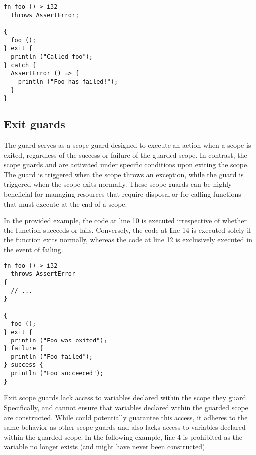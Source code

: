 \begin{lstlisting}[style=coloredverbatim]
fn foo ()-> i32
  throws AssertError;

{
  foo ();
} exit {
  println ("Called foo");
} catch {
  AssertError () => {
    println ("Foo has failed!");
  }
}
\end{lstlisting}

\subsection{Exit guards}
\label{sec:exit_guards}

The  guard serves as a scope guard designed to execute an action
when a scope is exited, regardless of the success or failure of the guarded
scope. In contrast, the scope guards  and  are
activated under specific conditions upon exiting the scope. The guard
 is triggered when the scope throws an exception, while the guard
 is triggered when the scope exits normally. These scope guards
can be highly beneficial for managing resources that require disposal or for
calling functions that must execute at the end of a scope.

\smallskip

In the provided example, the code at line 10 is executed irrespective of whether
the  function succeeds or fails. Conversely, the code at line 14 is
executed solely if the  function exits normally, whereas the code at
line 12 is exclusively executed in the event of  failing.

\begin{lstlisting}[style=coloredverbatim]
fn foo ()-> i32
  throws AssertError
{
  // ...
}

{
  foo ();
} exit {
  println ("Foo was exited");
} failure {
  println ("Foo failed");
} success {
  println ("Foo succeeded");
}
\end{lstlisting}

Exit scope guards lack access to variables declared within the scope they guard.
Specifically,  and  cannot ensure that variables
declared within the guarded scope are constructed. While  could
potentially guarantee this access, it adheres to the same behavior as other
scope guards and also lacks access to variables declared within the guarded
scope. In the following example, line 4 is prohibited as the variable 
no longer exists (and might have never been constructed).

